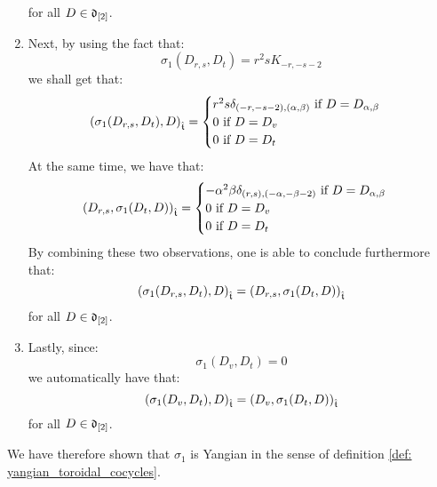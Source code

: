 \begin{example}
\begin{enumerate}
                for all $D \in \mathfrak{d}_{[2]}$.
                \item Next, by using the fact that:
                    $$\sigma_1(D_{r, s}, D_t) = r^2 s K_{-r, -s - 2}$$
                we shall get that:
                    $$
                        \left( \sigma_1(D_{r, s}, D_t), D \right)_{\hat{\mathfrak{t}}} =
                        \begin{cases}
                            \text{$r^2 s \delta_{(-r, -s - 2), (\alpha, \beta)}$ if $D = D_{\alpha, \beta}$}
                            \\
                            \text{$0$ if $D = D_v$}
                            \\
                            \text{$0$ if $D = D_t$}
                        \end{cases}
                    $$
                At the same time, we have that:
                    $$
                        \begin{aligned}
                            \left( D_{r, s}, \sigma_1(D_t, D) \right)_{\hat{\mathfrak{t}}} =
                            \begin{cases}
                                \text{$-\alpha^2 \beta \delta_{(r, s), (-\alpha, -\beta - 2)}$ if $D = D_{\alpha, \beta}$}
                                \\
                                \text{$0$ if $D = D_v$}
                                \\
                                \text{$0$ if $D = D_t$}
                            \end{cases}
                        \end{aligned}
                    $$
                By combining these two observations, one is able to conclude furthermore that:
                    $$\left( \sigma_1(D_{r, s}, D_t), D \right)_{\hat{\mathfrak{t}}} = \left( D_{r, s}, \sigma_1(D_t, D) \right)_{\hat{\mathfrak{t}}}$$
                for all $D \in \mathfrak{d}_{[2]}$.
                \item Lastly, since:
                    $$\sigma_1(D_v, D_t) = 0$$
                we automatically have that:
                    $$( \sigma_1(D_v, D_t), D )_{\hat{\mathfrak{t}}} = ( D_v, \sigma_1(D_t, D) )_{\hat{\mathfrak{t}}}$$
                for all $D \in \mathfrak{d}_{[2]}$.
            \end{enumerate}
            We have therefore shown that $\sigma_1$ is Yangian in the sense of definition \ref{def: yangian_toroidal_cocycles}. 
        \end{example}
